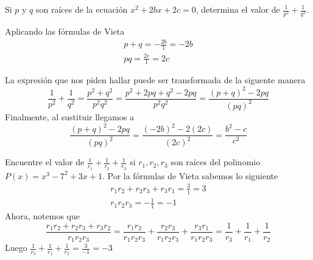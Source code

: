 {    \begin{example}
        Si $p$ y $q$ son raíces de la ecuación $x^2 + 2bx + 2c = 0$, determina el valor de $\frac{1}{p^2} + \frac{1}{q^2}.$

        \solution
        {
            Aplicando las fórmulas de Vieta
            \begin{gather*}
                p + q = - \frac{2b}{1} = - 2b \\
                pq = \frac{2c}{1} = 2c
            \end{gather*}

            La expresión que nos piden hallar puede ser transformada de la siguente manera
            \[\frac{1}{p^2} + \frac{1}{q^2} = \frac{p^2 + q^2}{p^2 q^2} = \frac{p^2 + 2pq + q^2 - 2pq}{p^2 q^2} = \frac{ (p + q)^2 - 2pq}{(pq)^2}\]
            Finalmente, al sustituir llegamos a
            \[\frac{ (p + q)^2 - 2pq}{(pq)^2} = \frac{ (-2b)^2 - 2(2c)}{(2c)^2} = \boxed{\frac{b^2 - c}{c^2}}\]
        }
    \end{example}

    \begin{example}
        Encuentre el valor de $\frac{1}{r_1} + \frac{1}{r_2} + \frac{1}{r_3}$ si $r_1, r_2, r_3$ son raíces del polinomio $P(x) = x^3 - 7^2 + 3x + 1$.
        \solution
        {
            Por la fórmulas de Vieta sabemos lo siguiente
            \begin{gather*}
                r_1 r_2 + r_2 r_3 + r_3 r_1 = \frac{3}{1} = 3 \\
                r_1 r_2 r_3 = - \frac{1}{1} = -1
            \end{gather*}
            Ahora, notemos que
            \[\frac{r_1 r_2 + r_2 r_3 + r_3 r_2}{r_1 r_2 r_3} = \frac{r_1 r_2}{r_1 r_2 r_3} + \frac{r_2 r_3}{r_1 r_2 r_3} + \frac{r_3 r_1}{r_1 r_2 r_3} = \frac{1}{r_3} + \frac{1}{r_1} + \frac{1}{r_2}\]
            Luego $\frac{1}{r_3} + \frac{1}{r_1} + \frac{1}{r_2} = \frac{3}{-1} = \boxed{-3}$
        }
    \end{example}

}
